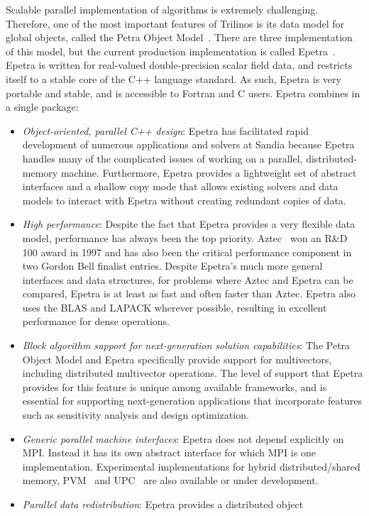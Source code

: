 \documentclass[]{llncs}      %
\begin{document}
 Scalable parallel implementation of algorithms is extremely
challenging.  Therefore, one of the most important features of Trilinos
is its data model for global objects, called the Petra Object
Model~\cite{6}.  There are three implementation of this model, but the
current production implementation is called Epetra~\cite{7}. Epetra is
written for real-valued double-precision scalar field data, and
restricts itself to a stable core of the C++ language standard.  As
such, Epetra is very portable and stable, and is accessible to Fortran
and C users. Epetra combines in a single package: 
\begin{itemize}
\item {\sl Object-oriented, parallel C++ design}: Epetra has facilitated
rapid development of numerous applications and solvers at Sandia because
Epetra handles many of the complicated issues of working on a parallel,
distributed-memory machine.  Furthermore, Epetra provides a lightweight
set of abstract interfaces and a shallow copy mode that allows existing
solvers and data models to interact with Epetra without creating
redundant copies of data.  
\item {\sl High performance}: Despite the fact that
Epetra provides a very flexible data model, performance has always been
the top priority.  Aztec~\cite{8} won an R\&D 100 award in 1997 and has
also been the critical performance component in two Gordon Bell finalist
entries.  Despite Epetra’s much more general interfaces and data
structures, for problems where Aztec and Epetra can be compared, Epetra
is at least as fast and often faster than Aztec.  Epetra also uses the
BLAS and LAPACK wherever possible, resulting in excellent performance
for dense operations.  
\item {\sl Block algorithm support for next-generation solution
capabilities}: The Petra Object Model and Epetra specifically provide
support for multivectors, including distributed multivector operations.
The level of support that Epetra provides for this feature is unique
among available frameworks, and is essential for supporting
next-generation applications that incorporate features such as
sensitivity analysis and design optimization. 
\item {\sl Generic parallel machine
interfaces}: Epetra does not depend explicitly on MPI.  Instead it has
its own abstract interface for which MPI is one implementation.
Experimental implementations for hybrid distributed/shared memory,
PVM~\cite{9} and UPC~\cite{10} are also available or under development.
\item {\sl Parallel data redistribution}: Epetra provides a distributed object

\end{itemize}
\end{document}

